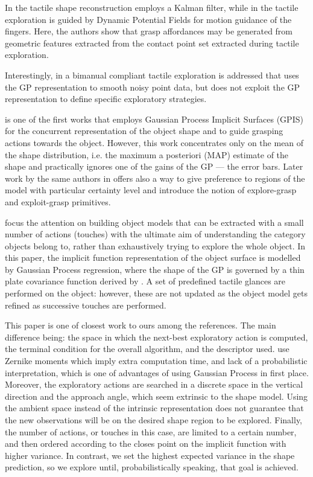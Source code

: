 In \citet{Meier2011Probabilistic} the tactile shape reconstruction employs a Kalman filter, while in \citet{Bierbaum2008Potential} the tactile exploration is guided by Dynamic Potential Fields for motion guidance
of the fingers. Here, the authors show that grasp affordances may
be generated from geometric features extracted from the contact point set extracted during tactile exploration.

Interestingly, in \citet{Sommer2014Bimanual} a bimanual compliant tactile exploration is addressed that uses the GP representation to smooth noisy point data, but does not exploit the GP representation to define specific exploratory strategies.

\cite{Dragiev2011Gaussian} is one of the first works that employs Gaussian Process Implicit Surfaces (GPIS) for the concurrent representation of the object shape and to guide grasping actions towards the object. However, this work concentrates only on the mean of the shape distribution, i.e. the maximum a posteriori (MAP) estimate of the shape and practically ignores one of the gains of the GP --- the error bars.
Later work by the same authors in \cite{Dragiev2013Uncertainty} offers also a way to give preference to regions of the model with particular certainty level and introduce the notion of explore-grasp and exploit-grasp primitives.

\citet{Bjorkman2013Enhancing} focus the attention on building object models that can be extracted with a small number of actions (touches) with the ultimate aim of understanding the category objects belong to, rather than exhaustively trying to explore the whole object. In this paper, the implicit function representation of the object surface is modelled by Gaussian Process regression, where the shape of the GP is governed by a thin plate covariance function derived by \citet{Williams2007Gaussian}. A set of predefined tactile glances are performed on the object: however, these are not updated as the object model gets refined as successive touches are performed.

This paper is one of closest work to ours among the references. The main difference being: the space in which the next-best exploratory action is computed, the terminal condition for the overall algorithm, and the descriptor used. \citet{Bjorkman2013Enhancing} use Zernike moments which imply extra computation time, and lack of a probabilistic interpretation, which is one of advantages of using Gaussian Process in first place. Moreover, the exploratory actions are searched in a discrete space in the vertical direction and the approach angle, which seem extrinsic to the shape model. Using the ambient space instead of the intrinsic representation does not guarantee that the new observations will be on the desired shape region to be explored.  Finally, the number of actions, or touches in this case, are limited to a certain number, and then ordered according to the closes point on the implicit function with higher variance. In contrast, we set the highest expected variance in the shape prediction, so we explore until, probabilistically speaking, that goal is achieved.

